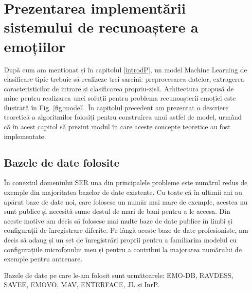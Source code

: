 \documentclass[a4paper,12pt]{book}
\begin{document}
				\section{Prezentarea implementării sistemului de recunoaștere a emoțiilor}
				
				După cum am menționat și în capitolul \ref{introdP}, un model Machine Learning de clasificare tipic trebuie să realizeze trei sarcini: preprocesarea datelor, extragerea caracteristicilor de intrare și clasificarea propriu-zisă. Arhitectura propusă de mine pentru realizarea unei soluții pentru problema recunoașterii emoției este ilustrată în Fig. \ref{fig:model}. În capitolul precedent am prezentat o descriere teoretică a algoritmilor folosiți pentru construirea unui astfel de model, urmând că în acest capitol să prezint modul în care aceste concepte teoretice au fost implementate.
				
					\subsection {Bazele de date folosite} \label{datasets}
					În conextul domeniului SER una din principalele probleme este numărul redus de exemple din majoritatea bazelor de date existente. Cu toate că în ultimii ani au apărut baze de date noi, care folosesc un număr mai mare de exemple, acestea nu sunt publice și necesită sume destul de mari de bani pentru a le accesa. Din aceste motive am decis să folosesc mai multe baze de date publice în limbi și configurații de înregistrare diferite. Pe lângă aceste baze de date profesioniste, am decis să adaug și un set de înregistrări proprii pentru a familiariza modelul cu configurațiile microfonului meu și pentru a contribui la majorarea numărului de exemple pentru antrenare.\par
					
					\newpage
					Bazele de date pe care le-am folosit sunt următoarele: EMO-DB, RAVDESS, SAVEE, EMOVO, MAV, ENTERFACE, JL și InrP.
					
\end{document}
